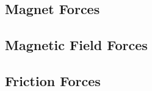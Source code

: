 
\subsection{Magnet Forces}
\label{sec:force_magnet}


\subsection{Magnetic Field Forces}
\label{sec:force_field}



\subsection{Friction Forces}
\label{sec:force_friction}




